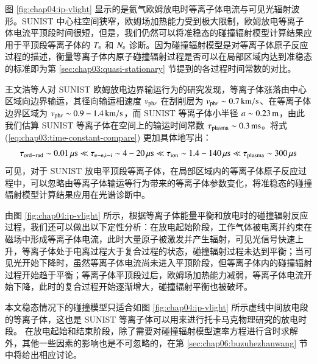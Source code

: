 图 \ref{fig:chap04:ip-vlight} 显示的是氦气欧姆放电时等离子体电流与可见光辐射波形。SUNIST 中心柱空间狭窄，欧姆场加热能力受到极大限制，欧姆放电等离子体电流平顶段时间很短\cite{TanYi2008:Thesis}，但是，我们仍然可以将准稳态的碰撞辐射模型计算结果应用于平顶段等离子体的 $T_{\rm e}$ 和 $N_{\rm e}$ 诊断。因为碰撞辐射模型是对等离子体原子反应过程的描述，衡量等离子体内原子碰撞辐射过程是否可以在局部区域内达到准稳态的标准即为第 \ref{sec:chap03:quasi-stationary} 节提到的各过程时间常数的对比。

王文浩等人\cite{WangWH2005:PPCF:Edge}对 SUNIST 欧姆放电边界输运行为的研究发现，等离子体涨落由中心区域向边界输运，其径向输运相速度 $v_{{\rm ph}r}$ 在刮削层为 $v_{{\rm ph}r}\sim0.7\,{\rm km}/{\rm s}$、在等离子体边界区域为 $v_{{\rm ph}r}\sim0.9-1.4\,{\rm km}/{\rm s}$，而 SUNIST 等离子体小半径 $a\sim0.23\,{\rm m}$，由此我们估算 SUNIST 等离子体在空间上的输运时间常数 $\tau_{\rm plasma}\sim0.3\,{\rm ms}$。将式 (\ref{eq:chap03:time-constant-compare}) 更加具体地写出：
\begin{equation}
\label{eq:chap04:time-constant-compare}
    \tau_{\rm ord-rad}\sim0.01\,\mu{\rm s}\ll
    \tau_{\rm e-e,i-i}\sim4-20\,\mu{\rm s}\ll
    \tau_{\rm ion}\sim1.4-140\,\mu{\rm s}\ll
    \tau_{\rm plasma}\sim300\,\mu{\rm s}
\end{equation}
可见，对于 SUNIST 放电平顶段等离子体，在局部区域内的等离子体原子反应过程中，可以忽略由等离子体输运等行为带来的等离子体参数变化，将准稳态的碰撞辐射模型计算结果应用在光谱诊断中。

由图 \ref{fig:chap04:ip-vlight} 所示，根据等离子体能量平衡和放电时的碰撞辐射反应过程，我们还可以做出以下定性分析：在放电起始阶段，工作气体被电离并约束在磁场中形成等离子体电流，此时大量原子被激发并产生辐射，可见光信号快速上升，等离子体处于电离过程大于复合过程的状态，碰撞辐射过程未达到平衡；当可见光开始下降时，虽然等离子体电流尚未进入平顶阶段，但等离子体内的碰撞辐射过程开始趋于平衡；等离子体平顶段过后，欧姆场加热能力减弱，等离子体电流开始下降，此时的复合过程开始逐渐增大，碰撞辐射平衡也被破坏。

本文稳态情况下的碰撞模型只适合如图 \ref{fig:chap04:ip-vlight} 所示虚线中间放电段的等离子体，这也是 SUNIST 等离子体可以用来进行托卡马克物理研究的放电时段。
在放电起始和结束阶段，除了需要对碰撞辐射模型速率方程进行含时求解外，其他一些因素的影响也是不可忽略的，在第 \ref{sec:chap06:buzuhezhanwang} 节中将给出相应讨论。

